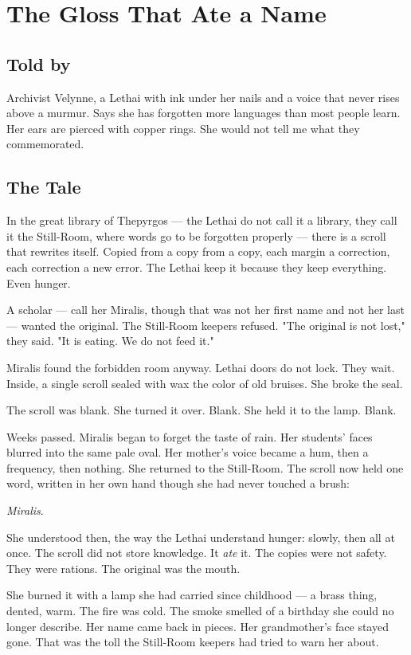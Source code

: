 \chapter{The Gloss That Ate a Name}

\section*{Told by}

Archivist Velynne, a Lethai with ink under her nails and a voice that never rises above a murmur. Says she has forgotten more languages than most people learn. Her ears are pierced with copper rings. She would not tell me what they commemorated.

\section*{The Tale}

In the great library of Thepyrgos --- the Lethai do not call it a library, they call it the Still-Room, where words go to be forgotten properly --- there is a scroll that rewrites itself. Copied from a copy from a copy, each margin a correction, each correction a new error. The Lethai keep it because they keep everything. Even hunger.

A scholar --- call her Miralis, though that was not her first name and not her last --- wanted the original. The Still-Room keepers refused. "The original is not lost," they said. "It is eating. We do not feed it."

Miralis found the forbidden room anyway. Lethai doors do not lock. They wait. Inside, a single scroll sealed with wax the color of old bruises. She broke the seal.

The scroll was blank. She turned it over. Blank. She held it to the lamp. Blank.

Weeks passed. Miralis began to forget the taste of rain. Her students' faces blurred into the same pale oval. Her mother's voice became a hum, then a frequency, then nothing. She returned to the Still-Room. The scroll now held one word, written in her own hand though she had never touched a brush:

\textit{Miralis}.

She understood then, the way the Lethai understand hunger: slowly, then all at once. The scroll did not store knowledge. It \emph{ate} it. The copies were not safety. They were rations. The original was the mouth.

She burned it with a lamp she had carried since childhood --- a brass thing, dented, warm. The fire was cold. The smoke smelled of a birthday she could no longer describe. Her name came back in pieces. Her grandmother's face stayed gone. That was the toll the Still-Room keepers had tried to warn her about.

